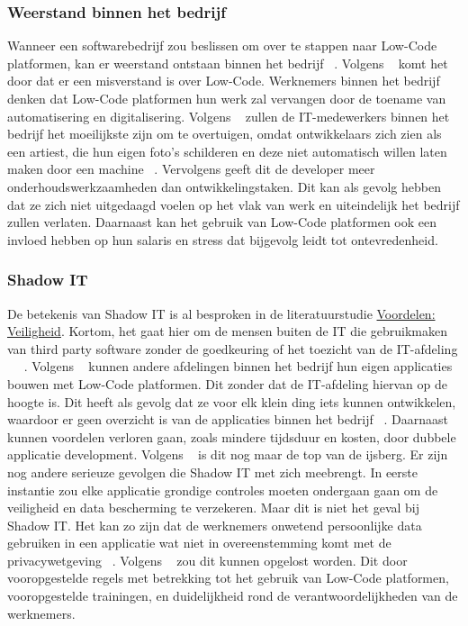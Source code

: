 \subsubsection*{Weerstand binnen het bedrijf}
\label{subsec:weerstand-binnen-het-bedrijf}
Wanneer een softwarebedrijf zou beslissen om over te stappen naar Low-Code platformen, kan er weerstand ontstaan binnen het bedrijf ~\autocite{Elshan2023}. 
Volgens ~\textcite{Elshan2023} komt het door dat er een misverstand is over Low-Code. 
Werknemers binnen het bedrijf denken dat Low-Code platformen hun werk zal vervangen door de toename van automatisering en digitalisering. 
Volgens ~\textcite{Elshan2023} zullen de IT-medewerkers binnen het bedrijf het moeilijkste zijn om te overtuigen, omdat ontwikkelaars zich zien als een artiest, 
die hun eigen foto's schilderen en deze niet automatisch willen laten maken door een machine ~\autocite{Elshan2023}. 
Vervolgens geeft dit de developer meer onderhoudswerkzaamheden dan ontwikkelingstaken. 
Dit kan als gevolg hebben dat ze zich niet uitgedaagd voelen op het vlak van werk en uiteindelijk het bedrijf zullen verlaten. 
Daarnaast kan het gebruik van Low-Code platformen ook een invloed hebben op hun salaris en stress dat bijgevolg leidt tot ontevredenheid.
\subsubsection*{Shadow IT}
\label{subsec:shadow-it}
De betekenis van Shadow IT is al besproken in de literatuurstudie \hyperref[subsec:veiligheid]{Voordelen: Veiligheid}. Kortom, het gaat hier om de mensen buiten de IT die gebruikmaken van third party software
zonder de goedkeuring of het toezicht van de IT-afdeling ~\autocite{Yan2021} ~\autocite{Rokis_2022}. 
 Volgens ~\textcite{Elshan2023} kunnen andere afdelingen binnen het bedrijf hun eigen applicaties bouwen met Low-Code platformen. 
 Dit zonder dat de IT-afdeling hiervan op de hoogte is. Dit heeft als gevolg dat ze voor elk klein ding iets kunnen ontwikkelen, waardoor er geen overzicht is van de applicaties binnen het bedrijf ~\autocite{Elshan2023}. 
 Daarnaast kunnen voordelen verloren gaan, zoals mindere tijdsduur en kosten, door dubbele applicatie development. 
 Volgens ~\textcite{Elshan2023} is dit nog maar de top van de ijsberg. Er zijn nog andere serieuze gevolgen die Shadow IT met zich meebrengt. 
 In eerste instantie zou elke applicatie grondige controles moeten ondergaan gaan om de veiligheid en data bescherming te verzekeren. 
 Maar dit is niet het geval bij Shadow IT. Het kan zo zijn dat de werknemers onwetend persoonlijke data gebruiken in een applicatie wat niet in overeenstemming 
 komt met de privacywetgeving ~\autocite{Elshan2023}. Volgens ~\textcite{Elshan2023} zou dit kunnen opgelost worden. Dit door vooropgestelde regels met betrekking tot het 
 gebruik van Low-Code platformen, vooropgestelde trainingen, en duidelijkheid rond de verantwoordelijkheden van de werknemers.

